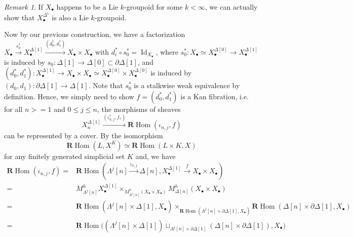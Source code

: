 \documentclass[12pt]{amsart}
\theoremstyle{definition}
\theoremstyle{remark}
\newtheorem{rem}[thm]{Remark}
\numberwithin{equation}{section}
\newcommand{\del}{\partial}
\renewcommand{\del}{\partial}
\newcommand{\BR}{{\mathbf R}}
\newcommand{\1}{{\mathbb{1}}}
\newcommand{\bt}{\bullet}
\newcommand{\Hom}{\operatorname{Hom}}
\newcommand{\id}{\operatorname{Id}}
\begin{document}
\begin{rem}
    If $X_{\bt}$ happens to be a Lie $k$-groupoid for some $k<\infty$, we can actually show that $X_{\bt}^{\Delta^1}$ is also a Lie $k$-groupoid.
\end{rem}
Now by our previous construction, we have a factorization $X_{\bullet}\stackrel{s^{*}_0}{\longrightarrow} X^{\Delta[1]}_{\bullet} \stackrel{(d^{*}_0, d^*_1)}{\longrightarrow} X_{\bullet} \times X_{\bullet}$ with 
$d^*_i \circ s_0^*=\id_{X_{\bullet}}$, where $s^*_0:X_{\bullet} \simeq X_{\bullet}^{\Delta[0]}\to X_{\bullet}^{\Delta[1]}$ is induced by $s_0: \Delta[1]\to \Delta[0] \subset \partial \Delta[1]$, and $(d^{*}_0, d^*_1):  X_{\bullet}^{\Delta[1]} \to  X_{\bullet} \times X_{\bullet}\simeq X_{\bullet}^{\Delta[0]} \times X_{\bullet}^{\Delta[0]}$ is induced by $(d_0, d_1): \partial \Delta[1] \to \Delta[1]$. Note that $s^*_0$ is a stalkwise weak equivalence by definition. Hence, we simply need to show  $f=(d^{*}_0, d^*_1)$ is a Kan fibration, i.e. for all $n >= 1$ and $0 \le j\le n$, the morphisms of sheaves
\begin{equation*}
    X_n^{\Delta[1]}\stackrel{(\iota^*_{n,j}, f_*)}{\longrightarrow} \BR\Hom(\iota_{n,j}, f)
\end{equation*}
can be represented by a cover. By the isomorphism
\begin{equation*}
    \BR\Hom(L, X^K) \simeq \BR\Hom(L\times K, X) 
\end{equation*}
for any finitely generated simplicial set $K$ and, we have 
\begin{align*}
    \BR\Hom(\iota_{n,j}, f) =& \BR\Hom(\Lambda^j[n] \stackrel{\iota_{n,j}}{\rightarrow} \Delta[n],X^{\Delta[1]}_{\bullet} \stackrel{f}{\longrightarrow} X_{\bullet} \times X_{\bullet} )\\
    =& M^h_{\Lambda^j[n]}X^{\Delta[1]}_{\bullet} \times_{M^h_{\Lambda^j[n]} (X_{\bullet} \times X_{\bullet})} M^h_{\Delta[n]} (X_{\bullet} \times X_{\bullet})\\
    =& \BR \Hom(\Lambda^j[n]\times \Delta[1], X_{\bt}) \times_{\BR \Hom(\Lambda^j[n]\times \del \Delta[1], X_{\bt})}  \BR \Hom( \Delta[n]\times \del \Delta[1], X_{\bt})\\
        =& \BR\Hom\big( (\Lambda^j[n] \times \Delta[1]) \sqcup_{\Lambda^j[n] \times \del\Delta[1] }(\Delta[n] \times \del\Delta[1]), X_{\bt}\big)
\end{align*}
\end{document}

